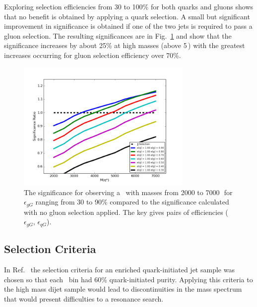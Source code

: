 Exploring selection efficiencies from 30 to 100\% for both quarks and gluons shows that no benefit 
is obtained by applying a quark selection. A small but significant improvement in significance is obtained 
if one of the two jets is required to pass a gluon selection. The resulting significances are  in Fig.~\ref{fig:QuarkGluonSignalSignificance}
and show that the significance increases by about 25\% at high masses (above 5\,\TeV ) with the greatest 
increases  occurring for gluon selection efficiency over 70\%. 


\begin{figure}[htb]
 \centering
\includegraphics[width=0.75\textwidth]{figures/tagging/QuarkGluonSignalSignificance3.png}
\caption{ The significance for observing a \qstar\ with masses from 2000 to 7000\,\GeV\ 
for $\epsilon_{gG}$ ranging from 30 to 90\% compared to the significance calculated with no gluon selection applied. The key gives pairs of efficiencies ($\epsilon_{gG}$, $\epsilon_{qG}$).
  \label{fig:QuarkGluonSignalSignificance}}
\end{figure}

\clearpage


\subsection{Selection Criteria}


In Ref.~\cite{ATL-PHYS-PUB-2017-009}  the selection criteria for  an
enriched quark-initiated jet sample was chosen so that each \pT\ bin had
60\% quark-initiated purity. Applying this criteria to the high mass
dijet sample would lead to discontinuities in the mass spectrum that
would present difficulties to a resonance search. 

